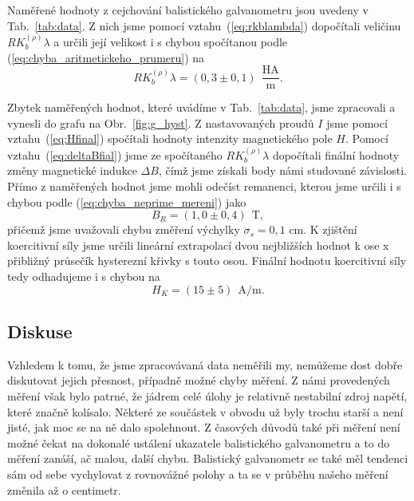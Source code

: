 \documentclass[english]{article}
\newcommand{\unit}[1]{\ \mathrm{#1}}
\begin{document}
			Naměřené hodnoty z cejchování balistického galvanometru jsou uvedeny v Tab.~\ref{tab:data}. Z nich jsme pomocí vztahu~(\ref{eq:rkblambda}) dopočítali veličinu $RK_b^{(\rho)}\lambda$ a určili její velikost i s chybou spočítanou podle (\ref{eq:chyba_aritmetickeho_prumeru}) na 
			\begin{equation}
					RK_b^{(\rho)}\lambda = (0,3\pm0,1)~\unit{\frac{HA}{m}}.
			\end{equation}
			
			Zbytek naměřených hodnot, které uvádíme v Tab.~\ref{tab:data}, jsme zpracovali a vynesli do grafu na Obr.~\ref{fig:g_hyst}. Z nastavovaných proudů $I$ jsme pomocí vztahu~(\ref{eq:Hfinal}) spočítali hodnoty intenzity magnetického pole $H$. Pomocí vztahu~(\ref{eq:deltaBfial}) jsme ze spočítaného $RK_b^{(\rho)}\lambda$ dopočítali finální hodnoty změny magnetické indukce $\Delta B$, čímž jsme získali body námi studované závislosti. Přímo z naměřených hodnot jsme mohli odečíst remanenci, kterou jsme určili i s chybou podle (\ref{eq:chyba_neprime_mereni}) jako  
			\begin{equation}
					B_R = (1,0\pm0,4)~\unit{T},
			\end{equation}
			přičemž jsme uvažovali chybu změření výchylky $\sigma_s=0,1$ cm.
			K zjištění koercitivní síly jsme určili lineární extrapolací dvou nejbližších hodnot k ose x přibližný průsečík hysterezní křivky s touto osou. Finální hodnotu koercitivní síly tedy odhadujeme i s chybou na 
			\begin{equation}
					H_K = (15\pm5)~\unit{A/m}.
			\end{equation}
			

			
	\subsection{Diskuse}
			Vzhledem k tomu, že jsme zpracovávaná data neměřili my, nemůžeme dost dobře diskutovat jejich přesnost, případně možné chyby měření. Z námi provedených měření však bylo patrné, že jádrem celé úlohy je relativně nestabilní zdroj napětí, které značně kolísalo. Některé ze součástek  v obvodu už byly trochu starší a není jisté, jak moc se na ně dalo spolehnout. Z časových důvodů také při měření není možné čekat na dokonalé ustálení ukazatele balistického galvanometru a to do měření zanáší, ač malou, další chybu. Balistický galvanometr se také měl tendenci sám od sebe vychylovat z rovnovážné polohy a ta se v průběhu našeho měření změnila až o centimetr. 
			
\end{document}
